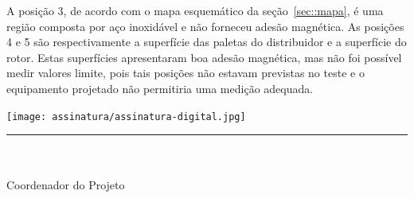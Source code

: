 \documentclass[12pt,a4paper]{article}
\begin{document}
A posição 3, de acordo com o mapa esquemático da seção~\ref{sec::mapa}, é uma
região composta por aço inoxidável e não forneceu adesão magnética. As posições
4 e 5 são respectivamente a superfície das paletas do distribuidor e a
superfície do rotor. Estas superfícies apresentaram boa adesão magnética, mas
não foi possível medir valores limite, pois tais posições não estavam previstas
no teste e o equipamento projetado não permitiria uma medição adequada.




\vspace{20mm}%
\parbox[t]{70mm}{
  \centering
  \texttt{[image: assinatura/assinatura-digital.jpg]} \\[-4mm]
  \rule[2mm]{70mm}{0.1mm} \\
  \ramon \\[1mm]
  Coordenador do Projeto \\
}


\end{document}
